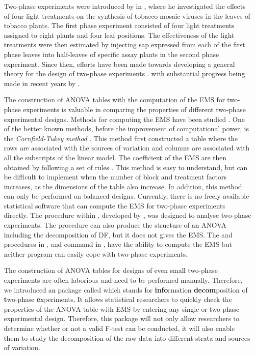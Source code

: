 \documentclass[article]{jss}
\begin{document}
Two-phase experiments were introduced by \citeauthor{McIntyre1955} in \citeyear{McIntyre1955}, where he investigated the effects of four light treatments on the synthesis of tobacco mosaic viruses in the leaves of tobacco plants. The first phase experiment consisted of four light treatments assigned to eight plants and four leaf positions. The effectiveness of the light treatments were then estimated by injecting sap expressed from each of the first phase leaves into half-leaves of specific assay plants in the second phase experiment. Since then, efforts have been made towards developing a general theory for the design of two-phase experiments \citep{Brien1983, Wood1988, Brien1999, Jarrett2008}. with substantial progress being made in recent years by \cite{Brien2006b, Brien2009, Brien2010}.

The construction of ANOVA tables with the computation of the EMS for two-phase experiments is valuable in comparing the properties of different two-phase experimental designs. Methods for computing the EMS have been studied \citep{Hartley1967, Gaylor1970, Goodnight1980}. One of the better known methods, before the improvement of computational power, is the \emph{Cornfield-Tukey method} \citep{Cornfield1956}. This method first constructed a table where the rows are associated with the sources of variation and columns are associated with all the subscripts of the linear model. The coefficient of the EMS are then obtained by following a set of rules  \citep{Cornfield1956}. This method is easy to understand, but can be difficult to implement when the number of block and treatment factors increases, as the dimensions of the table also increase. In addition, this method can only be performed on balanced designs. Currently, there is no freely available statistical software that can compute the EMS for two-phase experiments directly. The  procedure within , developed by \cite{Brien2006a}, was designed to analyse two-phase experiments. The  procedure can also produce the structure of an ANOVA including the decomposition of DF, but it does not gives the EMS. The  and  procedures in , and  command in , have the ability to compute the EMS but neither program can easily cope with two-phase experiments.

The construction of ANOVA tables for designs of even small two-phase experiments are often laborious and need to be performed manually. Therefore, we introduced an  package called  which stands for {\bf info}rmation {\bf decom}position of {\bf t}wo-phase {\bf e}xperiments. It allows statistical researchers to quickly check the properties of the ANOVA table with EMS by entering any single or two-phase experimental design. Therefore, this package will not only allow researchers to determine whether or not a valid F-test can be conducted, it will also enable them to study the decomposition of the raw data into different strata and sources of variation.
\end{document}
